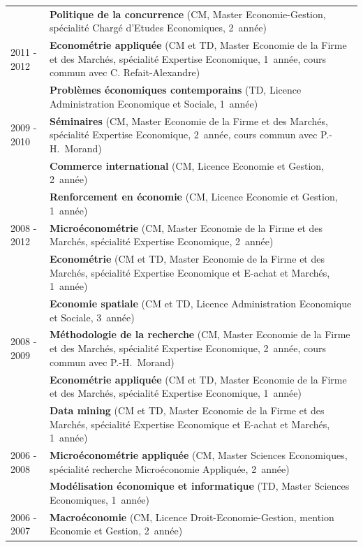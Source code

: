 \documentclass[a4paper,12pt]{article}
\begin{document}
\begin{longtable}{@{}p{\annee}p{\texte}@{}}
			& \textbf{Politique de la concurrence} (CM, Master Economie-Gestion, spécialité Chargé d'Etudes Economiques, 2\ieme{}~année) \\
2011 - 2012	& \textbf{Econométrie appliquée} (CM et TD, Master Economie de la Firme et des Marchés, spécialité Expertise Economique, 1\iere{}~année, cours commun avec C. Refait-Alexandre) \\
			& \textbf{Problèmes économiques contemporains} (TD, Licence Administration Economique et Sociale, 1\iere{}~année) \\	
2009 - 2010	& \textbf{Séminaires} (CM, Master Economie de la Firme et des Marchés, spécialité Expertise Economique, 2\ieme{}~année, cours commun avec P.-H.~Morand) \\
			& \textbf{Commerce international} (CM, Licence Economie et Gestion, 2\ieme{}~année) \\
			& \textbf{Renforcement en économie} (CM, Licence Economie et Gestion, 1\iere{}~année) \\
2008 - 2012	& \textbf{Microéconométrie} (CM, Master Economie de la Firme et des Marchés, spécialité Expertise Economique, 2\ieme{}~année) \\
			& \textbf{Econométrie} (CM et TD, Master Economie de la Firme et des Marchés, spécialité Expertise Economique et E-achat et Marchés, 1\iere{}~année) \\
			& \textbf{Economie spatiale} (CM et TD, Licence Administration Economique et Sociale, 3\ieme{}~année) \\ 
2008 - 2009	& \textbf{Méthodologie de la recherche} (CM, Master Economie de la Firme et des Marchés, spécialité Expertise Economique, 2\ieme{}~année, cours commun avec P.-H.~Morand) \\
		 	& \textbf{Econométrie appliquée} (CM et TD, Master Economie de la Firme et des Marchés, spécialité Expertise Economique, 1\iere{}~année) \\
			& \textbf{Data mining} (CM et TD, Master Economie de la Firme et des Marchés, spécialité Expertise Economique et E-achat et Marchés, 1\iere{}~année) \\
2006 - 2008	& \textbf{Microéconométrie appliquée} (CM, Master Sciences Economiques, spécialité recherche Microéconomie Appliquée, 2\ieme{}~année) \\
			& \textbf{Modélisation économique et informatique} (TD, Master Sciences Economiques, 1\iere{}~année) \\
2006 - 2007	& \textbf{Macroéconomie} (CM, Licence Droit-Economie-Gestion, mention Economie et Gestion, 2\ieme{}~année) \\
\end{longtable}
\end{document}
